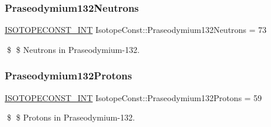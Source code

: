 \subsubsection{\texorpdfstring{Praseodymium132\+Neutrons}{Praseodymium132Neutrons}}
{\footnotesize\ttfamily \mbox{\hyperlink{group___isotope_const-_macros_ga5f18360b3e99483a35c32d789e62621c}{I\+S\+O\+T\+O\+P\+E\+C\+O\+N\+S\+T\+\_\+\+I\+NT}} Isotope\+Const\+::\+Praseodymium132\+Neutrons = 73}

\$ \$ Neutrons in Praseodymium-\/132. \mbox{\label{group___isotope_const-_praseodymium-_pr132_ga3e54706965218790e93fed09842a1bfa}} 
\subsubsection{\texorpdfstring{Praseodymium132\+Protons}{Praseodymium132Protons}}
{\footnotesize\ttfamily \mbox{\hyperlink{group___isotope_const-_macros_ga5f18360b3e99483a35c32d789e62621c}{I\+S\+O\+T\+O\+P\+E\+C\+O\+N\+S\+T\+\_\+\+I\+NT}} Isotope\+Const\+::\+Praseodymium132\+Protons = 59}

\$ \$ Protons in Praseodymium-\/132. 